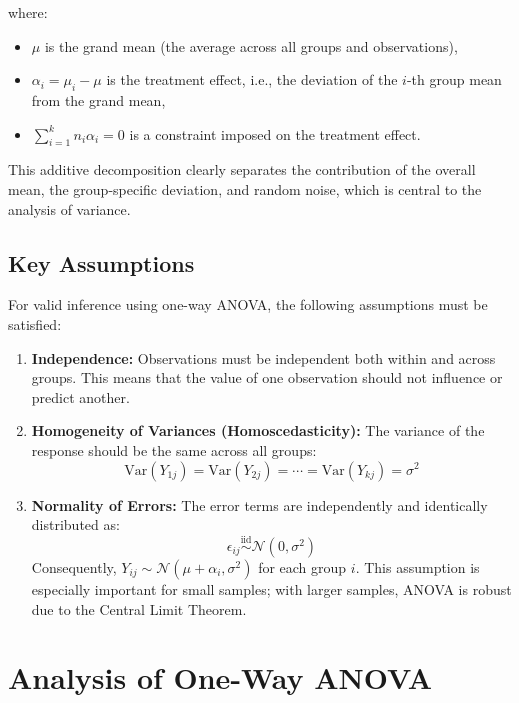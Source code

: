 \documentclass[twoside]{book}
\begin{document}
where:
\begin{itemize}
    \item \( \mu \) is the grand mean (the average across all groups and observations),
    \item \( \alpha_i = \mu_i - \mu \) is the treatment effect, i.e., the deviation of the \( i \)-th group mean from the grand mean,
    \item \(\displaystyle \sum_{i=1}^k n_i \alpha_i = 0 \) is a constraint imposed on the treatment effect.
\end{itemize}

This additive decomposition clearly separates the contribution of the overall mean, the group-specific deviation, and random noise, which is central to the analysis of variance.


\subsection{Key Assumptions}

For valid inference using one-way ANOVA, the following assumptions must be satisfied:

\begin{enumerate}
    \item \textbf{Independence:} Observations must be independent both within and across groups. This means that the value of one observation should not influence or predict another.

    \item \textbf{Homogeneity of Variances (Homoscedasticity):} The variance of the response should be the same across all groups:
    \[
    \text{Var}(Y_{1j}) = \text{Var}(Y_{2j}) = \cdots = \text{Var}(Y_{kj}) = \sigma^2
    \]

    \item \textbf{Normality of Errors:} The error terms are independently and identically distributed as:
        \[
        \epsilon_{ij} \overset{\text{iid}}{\sim} \mathcal{N}(0, \sigma^2)
        \]
        Consequently, \( Y_{ij} \sim \mathcal{N}(\mu + \alpha_i, \sigma^2) \) for each group $i$. This assumption is especially important for small samples; with larger samples, ANOVA is robust due to the Central Limit Theorem.
\end{enumerate}


\section{Analysis of One-Way ANOVA}
\end{document}
